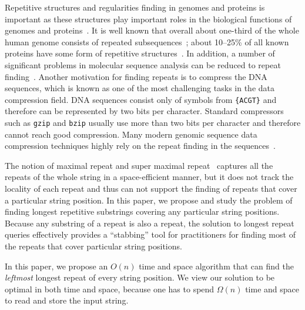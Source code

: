 \documentclass[preprint]{elsarticle}
\newcommand{\remove}[1]{}
\begin{document}
Repetitive structures and regularities finding in genomes and proteins
is important as these structures play important roles in the 
biological functions of genomes and proteins~\cite{Gus97}.  It is
well known that overall about one-third of the whole human genome
consists of repeated subsequences~\cite{McC1993}; about 10--25\% of
all known proteins have some form of repetitive
structures~\cite{LW06}. In addition, a number of significant problems
in molecular sequence analysis can be reduced to repeat
finding~\cite{Mar83}. Another motivation for finding repeats is to
compress the DNA sequences, which is known as one of the most
challenging tasks in the data compression field. DNA sequences consist
only of symbols from {\tt \{ACGT\}} and therefore can be represented
by two bits per character. Standard compressors such as {\tt gzip} and
{\tt bzip} usually use more than two bits per character and therefore
cannot reach good compression. Many modern genomic sequence data
compression techniques highly rely on the repeat finding in the
sequences~\cite{MR04,BF05}.







The notion of maximal repeat and super maximal
repeat~\cite{Gus97,KVX-BIBM2010,KVX-tcbb2012,BBO-spire2012} captures
all the repeats of the whole string in a space-efficient manner, but
it does not track the locality of each repeat and thus can not support
the finding of repeats that cover a particular string position.
In this paper, we propose and study the problem of finding longest
repetitive substrings covering any particular string positions.
Because any substring of a repeat is also a repeat, the solution to
longest repeat queries effectively provides a ``stabbing'' tool for
practitioners for finding most of the repeats that cover particular
string positions.
\remove{
The recent study of finding shortest unique substrings (SUS) covering
particular string positions~\cite{PWY-ICDE2013,
TIBT2014,IKX-CPM2014} may help find some repeats
covering particular string positions, because any extension of a SUS
must be a repeat.  However, such trivial reduction does not guarantee
the finding of the longest repeat that covers an arbitrary string
position. In fact, it is not yet well understood how to reduce longest
repeat finding to SUS finding.
}

In this paper, we propose an $O(n)$ time and space algorithm that can
find the \emph{leftmost} longest repeat of every string
position. We view our solution to be optimal in both time and space, 
because one has to spend $\Omega(n)$ time and space to read
and store the input string.
\end{document}

